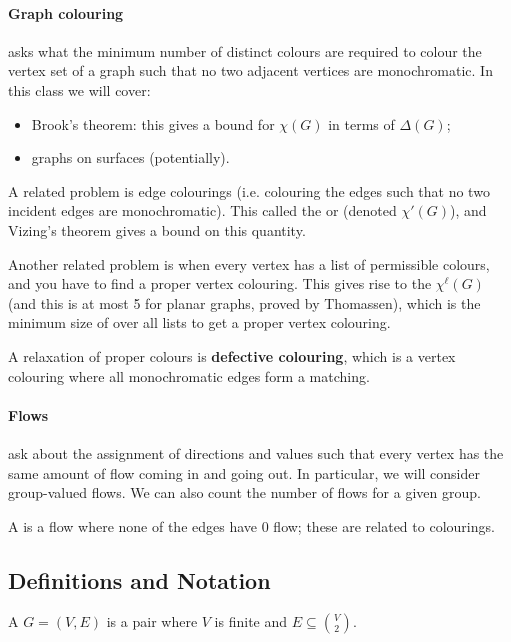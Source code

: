 \documentclass{scrartcl}
\begin{document}
\paragraph{Graph colouring} asks what the minimum number of distinct colours
are required to colour the vertex set of a graph such that no two adjacent
vertices are monochromatic.
In this class we will cover:
\begin{itemize}
  \item Brook's theorem: this gives a bound for $\chi(G)$ in terms of $\Delta(G)$;
  \item graphs on surfaces (potentially).
\end{itemize}

A related problem is edge colourings (i.e. colouring the edges such that no
two incident edges are monochromatic).
This called the  or 
(denoted $\chi'(G)$), and Vizing's theorem gives a bound on this quantity.

Another related problem is when every vertex has a list of permissible colours,
and you have to find a proper vertex colouring.
This gives rise to the  $\chi^\ell(G)$
(and this is at most 5 for planar graphs, proved by Thomassen),
which is the minimum size of over all lists to get a proper vertex colouring.

A relaxation of proper colours is \textbf{defective colouring}, which is a
vertex colouring where all monochromatic edges form a matching.

\paragraph{Flows} ask about the assignment of directions and values such that
every vertex has the same amount of flow coming in and going out.
In particular, we will consider group-valued flows.
We can also count the number of flows for a given group.

A  is a flow where none of the edges have 0 flow;
these are related to colourings.

\subsection{Definitions and Notation}
\begin{definition*}[Graph]
  A  $G = (V, E)$ is a pair where $V$ is finite and
  $E\subseteq\binom{V}{2}$.
\end{definition*}
\end{document}
